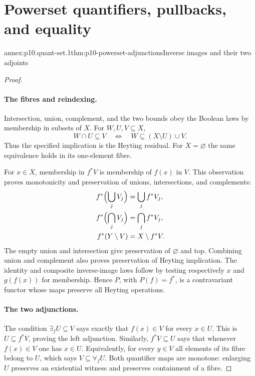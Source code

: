 
\section{Powerset quantifiers, pullbacks, and equality}

\begin{annexitem}{annex:p10.quant-set.1}{thm:p10-powerset-adjunctions}{Inverse images and their two adjoints}
\begin{proof}
\paragraph{The fibres and reindexing.}
Intersection, union, complement, and the two bounds obey the
Boolean laws by membership in subsets of \(X\).
For \(W,U,V\subseteq X\),
\[
 W\cap U\subseteq V
       \quad\Longleftrightarrow\quad
 W\subseteq(X\setminus U)\cup V.
\]
Thus the specified implication is the Heyting residual.
For \(X=\varnothing\) the same equivalence holds in its
one-element fibre.

For \(x\in X\), membership in \(f^*V\) is membership of \(f(x)\)
in \(V\).  This observation proves monotonicity and preservation
of unions, intersections, and complements:
\[
\begin{aligned}
 f^*\Bigl(\bigcup_j V_j\Bigr)&=\bigcup_j f^*V_j,\\
 f^*\Bigl(\bigcap_j V_j\Bigr)&=\bigcap_j f^*V_j,\\
 f^*(Y\setminus V)&=X\setminus f^*V.
\end{aligned}
\]
The empty union and intersection give preservation of
\(\varnothing\) and top.  Combining union and complement
also proves preservation of Heyting implication.
The identity and composite inverse-image laws follow by
testing respectively \(x\) and \(g(f(x))\) for membership.
Hence \(P\), with \(P(f)=f^*\), is a contravariant functor
whose maps preserve all Heyting operations.

\paragraph{The two adjunctions.}
The condition \(\exists_fU\subseteq V\) says exactly that
\(f(x)\in V\) for every \(x\in U\).
This is \(U\subseteq f^*V\), proving the left adjunction.
Similarly, \(f^*V\subseteq U\) says that whenever \(f(x)\in V\)
one has \(x\in U\).  Equivalently, for every \(y\in V\) all
elements of its fibre belong to \(U\), which says
\(V\subseteq\forall_fU\).
Both quantifier maps are monotone: enlarging \(U\) preserves
an existential witness and preserves containment of a fibre.


\end{proof}
\end{annexitem}
